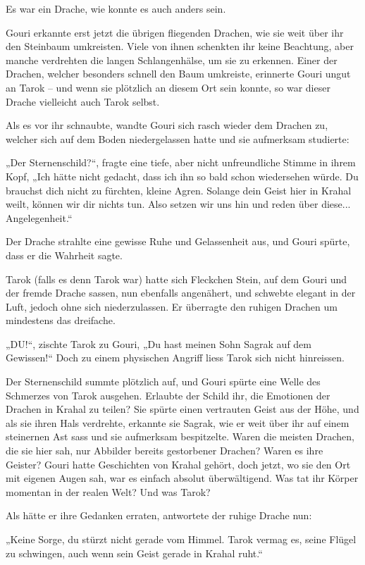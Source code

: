 Es war ein Drache, wie konnte es auch anders sein.

Gouri erkannte erst jetzt die übrigen fliegenden Drachen, wie sie weit über ihr den Steinbaum umkreisten. Viele von ihnen schenkten ihr keine Beachtung, aber manche verdrehten die langen Schlangenhälse, um sie zu erkennen. Einer der Drachen, welcher besonders schnell den Baum umkreiste, erinnerte Gouri ungut an Tarok – und wenn sie plötzlich an diesem Ort sein konnte, so war dieser Drache vielleicht auch Tarok selbst.

Als es vor ihr schnaubte, wandte Gouri sich rasch wieder dem Drachen zu, welcher sich auf dem Boden niedergelassen hatte und sie aufmerksam studierte:

„Der Sternenschild?“, fragte eine tiefe, aber nicht unfreundliche Stimme in ihrem Kopf, „Ich hätte nicht gedacht, dass ich ihn so bald schon wiedersehen würde. Du brauchst dich nicht zu fürchten, kleine Agren. Solange dein Geist hier in Krahal weilt, können wir dir nichts tun. Also setzen wir uns hin und reden über diese... Angelegenheit.“

Der Drache strahlte eine gewisse Ruhe und Gelassenheit aus, und Gouri spürte, dass er die Wahrheit sagte.

Tarok (falls es denn Tarok war) hatte sich Fleckchen Stein, auf dem Gouri und der fremde Drache sassen, nun ebenfalls angenähert, und schwebte elegant in der Luft, jedoch ohne sich niederzulassen. Er überragte den ruhigen Drachen um mindestens das dreifache.

„DU!“, zischte Tarok zu Gouri, „Du hast meinen Sohn Sagrak auf dem Gewissen!“ Doch zu einem physischen Angriff liess Tarok sich nicht hinreissen.

Der Sternenschild summte plötzlich auf, und Gouri spürte eine Welle des Schmerzes von Tarok ausgehen. Erlaubte der Schild ihr, die Emotionen der Drachen in Krahal zu teilen? Sie spürte einen vertrauten Geist aus der Höhe, und als sie ihren Hals verdrehte, erkannte sie Sagrak, wie er weit über ihr auf einem steinernen Ast sass und sie aufmerksam bespitzelte. Waren die meisten Drachen, die sie hier sah, nur Abbilder bereits gestorbener Drachen? Waren es ihre Geister? Gouri hatte Geschichten von Krahal gehört, doch jetzt, wo sie den Ort mit eigenen Augen sah, war es einfach absolut überwältigend. Was tat ihr Körper momentan in der realen Welt? Und was Tarok?

Als hätte er ihre Gedanken erraten, antwortete der ruhige Drache nun:

„Keine Sorge, du stürzt nicht gerade vom Himmel. Tarok vermag es, seine Flügel zu schwingen, auch wenn sein Geist gerade in Krahal ruht.“

